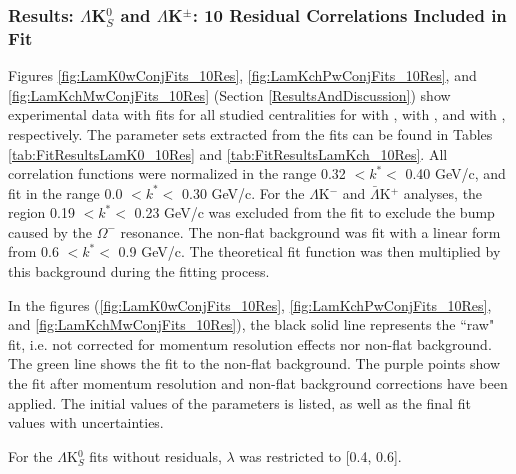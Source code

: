 \documentclass[../AnalysisNoteJBuxton.tex]{subfiles}
\begin{document}
\subsubsection{Results: \texorpdfstring{$\Lambda$K$^{0}_{S}$ and $\Lambda$K$^{\pm}$: 10 Residual Correlations Included in Fit}{TEXT}}
\label{ResultsLamK_10Res}

Figures \ref{fig:LamK0wConjFits_10Res}, \ref{fig:LamKchPwConjFits_10Res}, and \ref{fig:LamKchMwConjFits_10Res} (Section \ref{ResultsAndDiscussion}) show experimental data with fits for all studied centralities for \LamKs with \ALamKs, \LamKchP with \ALamKchM, and \LamKchM with \ALamKchP, respectively.
The parameter sets extracted from the fits can be found in Tables \ref{tab:FitResultsLamK0_10Res} and \ref{tab:FitResultsLamKch_10Res}.
All correlation functions were normalized in the range 0.32 $< k^{*} <$ 0.40 GeV/c, and fit in the range 0.0 $< k^{*} <$ 0.30 GeV/c.
For the $\Lambda$K$^{-}$ and $\bar{\Lambda}$K$^{+}$ analyses, the region 0.19 $< k^{*} <$ 0.23 GeV/c was excluded from the fit to exclude the bump caused by the $\Omega^{-}$ resonance.
The non-flat background was fit with a linear form from 0.6 $< k^{*} <$ 0.9 GeV/c.
The theoretical fit function was then multiplied by this background during the fitting process.

In the figures (\ref{fig:LamK0wConjFits_10Res}, \ref{fig:LamKchPwConjFits_10Res}, and \ref{fig:LamKchMwConjFits_10Res}), the black solid line represents the ``raw" fit, i.e. not corrected for momentum resolution effects nor non-flat background.
The green line shows the fit to the non-flat background.  The purple points show the fit after momentum resolution and non-flat background corrections have been applied.
The initial values of the parameters is listed, as well as the final fit values with uncertainties.

For the $\Lambda$K$^{0}_{S}$ fits without residuals, $\lambda$ was restricted to [0.4, 0.6].
\end{document}

